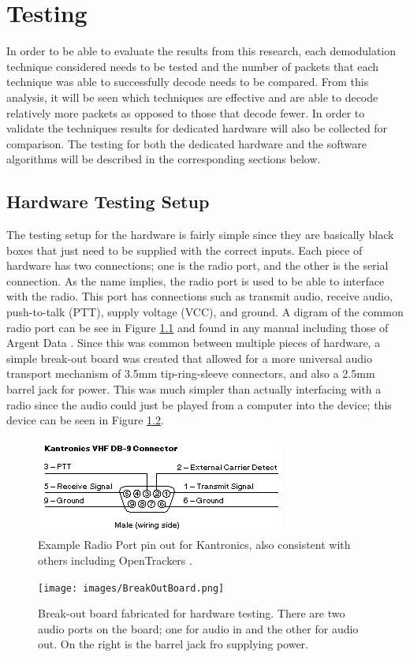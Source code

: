 \chapter{Testing}
In order to be able to evaluate the results from this research, each demodulation technique considered needs to be tested and the number of packets that each technique was able to successfully decode needs to be compared. From this analysis, it will be seen which techniques are effective and are able to decode relatively more packets as opposed to those that decode fewer. In order to validate the techniques results for dedicated hardware will also be collected for comparison. The testing for both the dedicated hardware and the software algorithms will be described in the corresponding sections below.

\section{Hardware Testing Setup}
The testing setup for the hardware is fairly simple since they are basically black boxes that just need to be supplied with the correct inputs. Each piece of hardware has two connections; one is the radio port, and the other is the serial connection. As the name implies, the radio port is used to be able to interface with the radio. This port has connections such as transmit audio, receive audio, push-to-talk (PTT), supply voltage (VCC), and ground. A digram of the common radio port can be see in Figure \ref{RadioPortPinout} and found in any manual including those of Argent Data \cite{Systems2013}. Since this was common between multiple pieces of hardware, a simple break-out board was created that allowed for a more universal audio transport mechanism of 3.5mm tip-ring-sleeve connectors, and also a 2.5mm barrel jack for power. This was much simpler than actually interfacing with a radio since the audio could just be played from a computer into the device; this device can be seen in Figure \ref{BreakOutBoard}. 

\begin{figure}
  \centering
	\includegraphics[width=0.75\linewidth]{images/RadioPortPinout.png} 
	\caption{Example Radio Port pin out for Kantronics, also consistent with others including OpenTrackers \cite{Martin2014}.}
   \label{RadioPortPinout}
\end{figure}
\begin{figure}
  \centering
	\texttt{[image: images/BreakOutBoard.png]} 
	\caption{Break-out board fabricated for hardware testing. There are two audio ports on the board; one for audio in and the other for audio out. On the right is the barrel jack fro supplying power.}
   \label{BreakOutBoard}
\end{figure}

